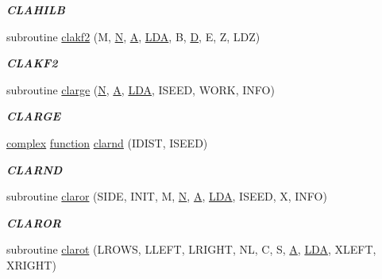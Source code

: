 \begin{DoxyCompactItemize}
\begin{DoxyCompactList}\small\item\em {\bfseries C\+L\+A\+H\+I\+L\+B} \end{DoxyCompactList}\item 
subroutine \hyperlink{group__complex__matgen_ga7a28051d16bc46beecf83a6cacad4b37}{clakf2} (M, \hyperlink{polmisc_8c_a0240ac851181b84ac374872dc5434ee4}{N}, \hyperlink{classA}{A}, \hyperlink{example__user_8c_ae946da542ce0db94dced19b2ecefd1aa}{L\+D\+A}, B, \hyperlink{odrpack_8h_a7dae6ea403d00f3687f24a874e67d139}{D}, E, Z, L\+D\+Z)
\begin{DoxyCompactList}\small\item\em {\bfseries C\+L\+A\+K\+F2} \end{DoxyCompactList}\item 
subroutine \hyperlink{group__complex__matgen_ga591e57991ad92ea8cc4ffd534c682bf9}{clarge} (\hyperlink{polmisc_8c_a0240ac851181b84ac374872dc5434ee4}{N}, \hyperlink{classA}{A}, \hyperlink{example__user_8c_ae946da542ce0db94dced19b2ecefd1aa}{L\+D\+A}, I\+S\+E\+E\+D, W\+O\+R\+K, I\+N\+F\+O)
\begin{DoxyCompactList}\small\item\em {\bfseries C\+L\+A\+R\+G\+E} \end{DoxyCompactList}\item 
\hyperlink{structcomplex}{complex} \hyperlink{afunc_8m_a7b5e596df91eadea6c537c0825e894a7}{function} \hyperlink{group__complex__matgen_gac45992478d4a059e7d62f403077a78fd}{clarnd} (I\+D\+I\+S\+T, I\+S\+E\+E\+D)
\begin{DoxyCompactList}\small\item\em {\bfseries C\+L\+A\+R\+N\+D} \end{DoxyCompactList}\item 
subroutine \hyperlink{group__complex__matgen_ga463c7fe8bfbf095b0c8703935e2b619a}{claror} (S\+I\+D\+E, I\+N\+I\+T, M, \hyperlink{polmisc_8c_a0240ac851181b84ac374872dc5434ee4}{N}, \hyperlink{classA}{A}, \hyperlink{example__user_8c_ae946da542ce0db94dced19b2ecefd1aa}{L\+D\+A}, I\+S\+E\+E\+D, X, I\+N\+F\+O)
\begin{DoxyCompactList}\small\item\em {\bfseries C\+L\+A\+R\+O\+R} \end{DoxyCompactList}\item 
subroutine \hyperlink{group__complex__matgen_ga8b101f20bbd35d0294b4579e539dc607}{clarot} (L\+R\+O\+W\+S, L\+L\+E\+F\+T, L\+R\+I\+G\+H\+T, N\+L, C, S, \hyperlink{classA}{A}, \hyperlink{example__user_8c_ae946da542ce0db94dced19b2ecefd1aa}{L\+D\+A}, X\+L\+E\+F\+T, X\+R\+I\+G\+H\+T)

\end{DoxyCompactItemize}
